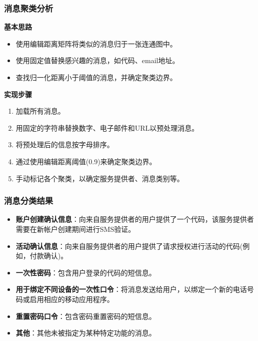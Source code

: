\documentclass[10pt,aspectratio=43,mathserif]{beamer}
\begin{document}
        \begin{frame}
		  \frametitle{\textbf{消息聚类分析}}
            \begin{block}{\textbf{基本思路}}
                \begin{itemize}
                    \item 使用编辑距离矩阵将类似的消息归于一张连通图中。
                    \item 使用固定值替换感兴趣的消息，如代码、email地址。
                    \item 查找归一化距离小于阈值的消息，并确定聚类边界。
                \end{itemize}
            \end{block}

            \begin{block}{\textbf{实现步骤}}
                \begin{enumerate}
                  \item 加载所有消息。
                  \item 用固定的字符串替换数字、电子邮件和URL以预处理消息。
                  \item 将预处理后的信息按字母排序。
                  \item 通过使用编辑距离阈值(0.9)来确定聚类边界。
                  \item 手动标记各个聚类，以确定服务提供者、消息类别等。
                \end{enumerate}
            \end{block}
		\end{frame}

        \begin{frame}
		  \frametitle{\textbf{消息分类结果}}
            \begin{itemize}
                \item \textbf{账户创建确认信息}：向来自服务提供者的用户提供了一个代码，该服务提供者需要在新帐户创建期间进行SMS验证。
                \item \textbf{活动确认信息}：向来自服务提供者的用户提供了请求授权进行活动的代码(例如，付款确认)。
                \item \textbf{一次性密码}：包含用户登录的代码的短信息。
                \item \textbf{用于绑定不同设备的一次性口令}：将消息发送给用户，以绑定一个新的电话号码或启用相应的移动应用程序。
                \item \textbf{重置密码口令}：包含密码重置密码的短信息。
                \item \textbf{其他}：其他未被指定为某种特定功能的消息。
            \end{itemize}
		\end{frame}
\end{document}
